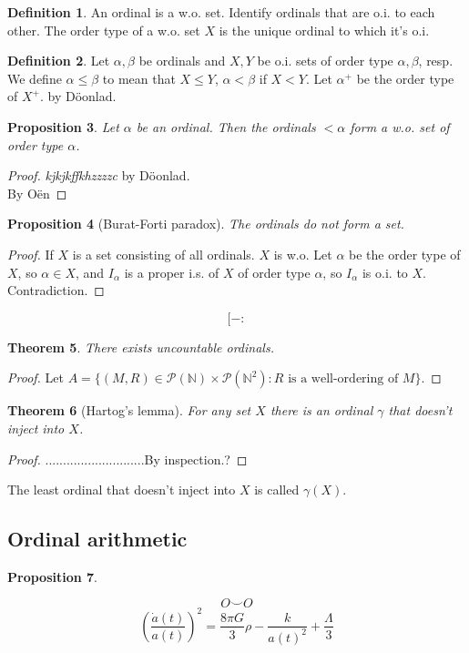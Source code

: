 \documentclass{article}
\theoremstyle{definition}
\newtheorem{defn}{Definition}[section]
\theoremstyle{remark}
\theoremstyle{plain}
\newtheorem{thm}[defn]{Theorem}
\newtheorem{prop}[defn]{Proposition}
\newcommand{\NN}{\mathbb{N}}
\begin{document}
\begin{defn}
    An ordinal is a w.o. set. Identify ordinals that are o.i. to each other. The order type of a w.o. set $X$ is the unique ordinal to which it's o.i.
\end{defn}
\begin{defn}
    Let $\alpha,\beta$ be ordinals and $X, Y$ be o.i. sets of order type $\alpha,\beta$, resp. We define $\alpha\le\beta$ to mean that $X\le Y$, $\alpha<\beta$ if $X<Y$. Let $\alpha^+$ be the order type of $X^+$.  by D\"oonlad.
\end{defn}

\begin{prop}
    Let $\alpha$ be an ordinal. Then the ordinals \(<\alpha\) form a w.o. set of order type $\alpha$.
\end{prop}
\begin{proof}
    \textit{kjkjkffkhzzzzc} by D\"oonlad.\\
     By O\"en
\end{proof}
\begin{prop}[Burat-Forti paradox]
    The ordinals do not form a set.
\end{prop}
\begin{proof}
    If $X$ is a set consisting of all ordinals. $X$ is w.o. Let $\alpha$ be the order type of $X$, so $\alpha\in X$, and $I_\alpha$ is a proper i.s. of $X$ of order type $\alpha$, so $I_\alpha$ is o.i. to $X$. Contradiction.
\end{proof}
\[[-:\tag{Owen's Signature}\]
\begin{thm}
    There exists uncountable ordinals.
\end{thm}
\begin{proof}
    Let $A=\{(M,R)\in \mathscr P(\NN)\times\mathscr P(\NN^2):R\text{ is a well-ordering of }M\}$.
\end{proof}
\begin{thm}[Hartog's lemma]
    For any set $X$ there is an ordinal $\gamma$ that doesn't inject into $X$.
\end{thm}
\begin{proof}
    ............................By inspection.?
\end{proof}
The least ordinal that doesn't inject into $X$ is called $\gamma(X)$.
\subsection*{Ordinal arithmetic}
\begin{prop}
    
\end{prop}
\[O\smile O\tag{Owen's signature}\]
\begin{equation}
   \left( \frac{\dot{a}(t)}{a(t)} \right)^2 = \frac{8\pi G}{3}\rho - \frac{k}{a(t)^2} + \frac{\Lambda}{3}
   \label{eq:friedmann_1}
\end{equation}
\end{document}
